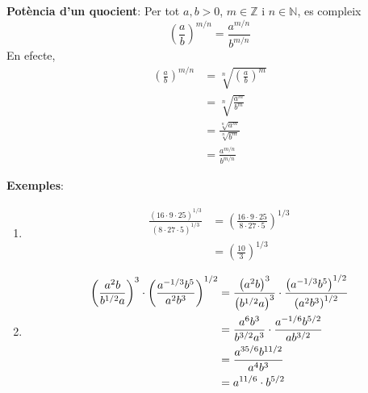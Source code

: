 \textbf{Potència d’un quocient}: Per tot $a,b>0$, $m\in \mathbb{Z}$ i $%
n\in \mathbb{N}$, es compleix%
\begin{equation*}
\left( \frac{a}{b}\right) ^{m/n}=\frac{a^{m/n}}{b^{m/n}}
\end{equation*}%
En efecte,%
\begin{align*}
\left( \frac{a}{b}\right) ^{m/n} &=\sqrt[n]{\left( \frac{a}{b}\right) ^{m}}
\\
&=\sqrt[n]{\frac{a^{m}}{b^{m}}} \\
&=\frac{\sqrt[n]{a^{m}}}{\sqrt[n]{b^{m}}} \\
&=\frac{a^{m/n}}{b^{m/n}}
\end{align*}

\textbf{Exemples}:

\begin{enumerate}
\item 
\begin{align*}
\frac{(16\cdot 9\cdot 25)^{1/3}}{\left( 8\cdot 27\cdot 5\right) ^{1/3}}
&=\left( \frac{16\cdot 9\cdot 25}{8\cdot 27\cdot 5}\right) ^{1/3} \\
&=\left( \frac{10}{3}\right) ^{1/3}
\end{align*}

\item 
\begin{align*}
\left( \frac{a^{2}b}{b^{1/2}a}\right) ^{3}\cdot \left( \frac{a^{-1/3}b^{5}}{%
a^{2}b^{3}}\right) ^{1/2} &=\frac{\left( a^{2}b\right) ^{3}}{\left(
b^{1/2}a\right) ^{3}}\cdot \frac{\left( a^{-1/3}b^{5}\right) ^{1/2}}{\left(
a^{2}b^{3}\right) ^{1/2}} \\
&=\frac{a^{6}b^{3}}{b^{3/2}a^{3}}\cdot \frac{a^{-1/6}b^{5/2}}{ab^{3/2}} \\
&=\frac{a^{35/6}b^{11/2}}{a^{4}b^{3}} \\
&=a^{11/6}\cdot b^{5/2}
\end{align*}
\end{enumerate} 